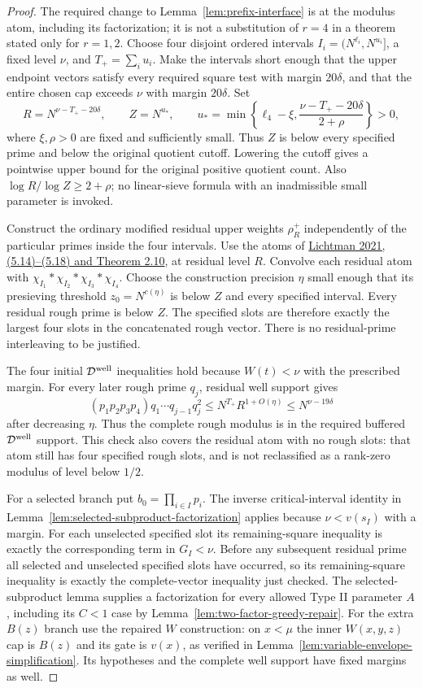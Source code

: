 \begin{proof}
The required change to Lemma~\ref{lem:prefix-interface} is at the
modulus atom, including its factorization; it is not a substitution
of $r=4$ in a theorem stated only for $r=1,2$.
Choose four disjoint ordered intervals
$I_i=(N^{\ell_i},N^{u_i}]$, a fixed level $\nu$, and
$T_+=\sum_i u_i$.  Make the intervals short enough that the upper
endpoint vectors satisfy every required square test with margin
$20\delta$, and that the entire chosen cap exceeds $\nu$ with
margin $20\delta$.  Set
\[
 R=N^{\nu-T_+-20\delta},\qquad
 Z=N^{u_*},\qquad
 u_* =\min\left\{\ell_4-\xi,
                 \frac{\nu-T_+-20\delta}{2+\rho}\right\}>0,
\]
where $\xi,\rho>0$ are fixed and sufficiently small.  Thus $Z$ is
below every specified prime and below the original quotient cutoff.
Lowering the cutoff gives a pointwise upper bound for the original
positive quotient count.  Also $\log R/\log Z\ge2+\rho$; no
linear-sieve formula with an inadmissible small parameter is invoked.

Construct the ordinary modified residual upper weights $\rho_R^+$
independently of the particular primes inside the four intervals.
Use the atoms of
\href{https://arxiv.org/html/2109.02851v2}{Lichtman 2021,
(5.14)--(5.18) and Theorem 2.10}, at residual level $R$.
Convolve each residual atom with
$\chi_{I_1}*\chi_{I_2}*\chi_{I_3}*\chi_{I_4}$.
Choose the construction precision $\eta$ small enough that its
presieving threshold $z_0=N^{c(\eta)}$ is below $Z$ and every
specified interval.  Every residual rough prime is below $Z$.
The specified slots are therefore exactly the largest four slots
in the concatenated rough vector.  There is no residual-prime
interleaving to be justified.

The four initial $\mathcal D^{\rm well}$ inequalities hold because
$W(t)<\nu$ with the prescribed margin.  For every later rough prime
$q_j$, residual well support gives
\[
 (p_1p_2p_3p_4)q_1\cdots q_{j-1}q_j^2
 \le N^{T_+}R^{1+O(\eta)}\le N^{\nu-19\delta}
\]
after decreasing $\eta$.  Thus the complete rough modulus is in
the required buffered $\mathcal D^{\rm well}$ support.  This check
also covers the residual atom with no rough slots: that atom still
has four specified rough slots, and is not reclassified as a
rank-zero modulus of level below $1/2$.

For a selected branch put $b_0=\prod_{i\in I}p_i$.
The inverse critical-interval identity in
Lemma~\ref{lem:selected-subproduct-factorization} applies because
$\nu<v(s_I)$ with a margin.  For each unselected specified slot its
remaining-square inequality is exactly the corresponding term in
$G_I<\nu$.  Before any subsequent residual prime all selected and
unselected specified slots have occurred, so its remaining-square
inequality is exactly the complete-vector inequality just checked.
The selected-subproduct lemma supplies a factorization for every
allowed Type II parameter $A$, including its $C<1$ case by
Lemma~\ref{lem:two-factor-greedy-repair}.  For the extra $B(z)$
branch use the repaired $W$ construction: on $x<\mu$ the inner
$W(x,y,z)$ cap is $B(z)$ and its gate is $v(x)$, as verified in
Lemma~\ref{lem:variable-envelope-simplification}.  Its hypotheses
and the complete well support have fixed margins as well.


\end{proof}
